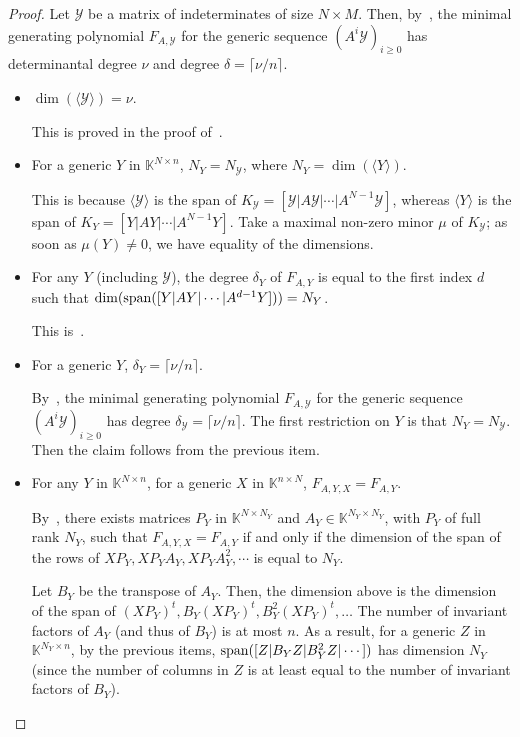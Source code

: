 \documentclass[12pt]{article}
\def\K{\mathbb{K}}
\def\scrY{\mathscr{Y}}
\begin{document}
\begin{proof}
Let $\scrY$ be a matrix of indeterminates of size $N \times M$.
Then, by~\cite[Proposition 6.1]{Villard97a}, the minimal generating
polynomial $F_{A,\scrY}$ for the generic sequence $(A^i\scrY)_{i \ge
  0}$ has determinantal degree $\nu$ and degree $\delta =\lceil
\nu/n\rceil$.


\begin{itemize}
\item $\dim(\langle \scrY \rangle)=\nu$.
  
  This is proved in the proof of~\cite[Proposition~6.1]{Villard97a}.

\item For a generic $Y$ in $\K^{N\times n}$, $N_Y=N_\scrY$, 
  where $N_Y=\dim(\langle Y \rangle)$.

  This is because $\langle \scrY\rangle$ is the span of $K_\scrY=[\scrY | A
    \scrY | \cdots | A^{N-1} \scrY]$, whereas $\langle Y\rangle$ is the span of
  $K_Y=[Y | A Y | \cdots |A^{N-1} Y]$. Take a maximal non-zero minor $\mu$ of $K_\scrY$;
  as soon as $\mu(Y)\ne 0$, we have equality of the dimensions.

\item For any $Y$ (including $\scrY$), the degree $\delta_Y$ of $F_{A,Y}$ is equal to the first 
  index $d$ such that $\dim({\rm span}([Y | A Y | \cdots |A^{d-1} Y]))=N_Y$.

  This is~\cite[Lemma~4.3]{Villard97a}.

\item For a generic $Y$,  $\delta_Y=\lceil \nu/n\rceil$.

  By~\cite[Proposition 6.1]{Villard97a}, the minimal generating
  polynomial $F_{A,\scrY}$ for the generic sequence $(A^i\scrY)_{i \ge
    0}$ has degree $\delta_\scrY =\lceil\nu/n\rceil$. The first
  restriction on $Y$ is that $N_Y=N_\scrY$. Then the claim follows
  from the previous item.

\item For any $Y$ in $\K^{N \times n}$, for a generic $X$  in $\K^{n \times N}$, $F_{A,Y,X}=F_{A,Y}$.

  By~\cite[Lemma~4.2]{Villard97a}, there exists matrices $P_Y$ in
  $\K^{N\times N_Y}$ and $A_Y \in \K^{N_Y \times N_Y}$, with $P_Y$ of
  full rank $N_Y$, such that $F_{A,Y,X}=F_{A,Y}$ if and only if the
  dimension of the span of the rows of $X P_Y,X P_Y A_Y,X P_Y
  A^2_Y,\cdots$ is equal to $N_Y$. 

  Let $B_Y$ be the transpose of $A_Y$. Then, the dimension above is
  the dimension of the span of $(X P_Y)^t, B_Y (X P_Y)^t, B_Y^2 (X
  P_Y)^t, \dots$ The number of invariant factors of $A_Y$ (and thus of
  $B_Y$) is at most $n$.  As a result, for a generic $Z$ in $\K^{N_Y
    \times n}$, by the previous items, ${\rm span}([Z|B_Y Z| B_Y^2 Z|\cdots])$ has dimension $N_Y$ (since the number of columns in $Z$
  is at least equal to the number of invariant factors of $B_Y$).


\end{itemize}
\end{proof}
\end{document}
